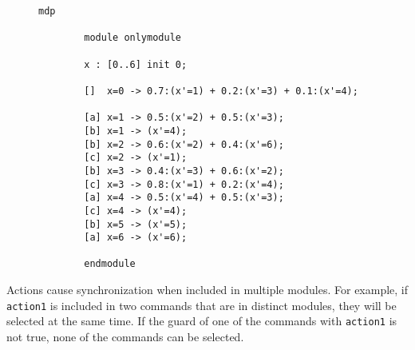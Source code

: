 \documentclass[preview]{standalone}
\begin{document}
\begin{figure}
	\begin{lstlisting}[language=prism, caption={\prism model file for the \mdpN \mdp given by Figure \ref{fig:exampleMdp}. This example has only one variable representing the six states in \mdp and the actions \texttt{a}, \texttt{b} and \texttt{c} referring to \action, \actionb, and \actionc in \mdp, which are only used for labeling here. The initial distribution has to be realized with an additional state (\texttt{x=0}).},label={lst:exmpprism}]
		mdp
		
		module onlymodule
		
		x : [0..6] init 0;
		
		[]  x=0 -> 0.7:(x'=1) + 0.2:(x'=3) + 0.1:(x'=4);
		
		[a] x=1 -> 0.5:(x'=2) + 0.5:(x'=3);
		[b] x=1 -> (x'=4);
		[b] x=2 -> 0.6:(x'=2) + 0.4:(x'=6);
		[c] x=2 -> (x'=1);
		[b] x=3 -> 0.4:(x'=3) + 0.6:(x'=2);
		[c] x=3 -> 0.8:(x'=1) + 0.2:(x'=4);
		[a] x=4 -> 0.5:(x'=4) + 0.5:(x'=3);
		[c] x=4 -> (x'=4);
		[b] x=5 -> (x'=5);
		[a] x=6 -> (x'=6);
		
		endmodule	
	\end{lstlisting}
\end{figure}

Actions cause synchronization when included in multiple modules. For example, if \texttt{action1} is included in two commands that are in distinct modules, they will be selected at the same time. If the guard of one of the commands with \texttt{action1} is not true, none of the commands can be selected\cite{Kwiatkowska2000, Kwiatkowska2011}.


\end{document}
